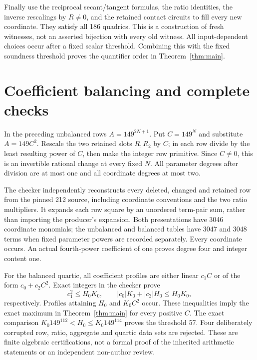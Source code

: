 \documentclass[11pt,a4paper]{article}
\begin{document}
Finally use the reciprocal secant/tangent formulas, the ratio
identities, the inverse rescalings by $R\ne0$, and the retained
contact circuits to fill every new coordinate. They satisfy all 186
quadrics. This is a construction of fresh witnesses, not an asserted
bijection with every old witness. All input-dependent choices occur
after a fixed scalar threshold. Combining this with the fixed
soundness threshold proves the quantifier order in Theorem~\ref{thm:main}.

\section{Coefficient balancing and complete checks}
In the preceding unbalanced rows $A=149^{2N+1}$. Put $C=149^N$ and
substitute $A=149C^2$. Rescale the two retained slots $R,R_2$ by $C$;
in each row divide by the least resulting power of $C$, then make the
integer row primitive. Since $C\ne0$, this is an invertible rational
change at every fixed $N$. All parameter degrees after division are
at most one and all coordinate degrees at most two.

The checker independently reconstructs every deleted, changed and
retained row from the pinned 212 source, including coordinate
conventions and the two ratio multipliers. It expands each row square
by an unordered term-pair sum, rather than importing the producer's
expansion. Both presentations have 3046 coordinate monomials; the
unbalanced and balanced tables have 3047 and 3048 terms when fixed
parameter powers are recorded separately. Every coordinate occurs.
An actual fourth-power coefficient of one proves degree four and
integer content one.

For the balanced quartic, all coefficient profiles are either linear
$c_1C$ or of the form $c_0+c_2C^2$. Exact integers in the checker prove
\[
 c_1^2\le H_0K_0,
 \qquad |c_0|K_0+|c_2|H_0\le H_0K_0,
\]
respectively. Profiles attaining $H_0$ and $K_0C^2$ occur. These
inequalities imply the exact maximum in Theorem~\ref{thm:main} for
every positive $C$. The exact comparison
$K_0 149^{112}<H_0\le K_0 149^{114}$ proves the threshold 57.
Four deliberately corrupted row, ratio, aggregate and quartic data
sets are rejected. These are finite algebraic certifications, not a
formal proof of the inherited arithmetic statements or an independent
non-author review.
\end{document}
